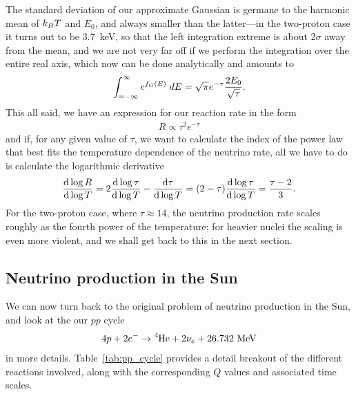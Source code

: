 The standard deviation of our approximate Gaussian is germane to the harmonic mean
of $k_B T$ and $E_0$, and always smaller than the latter---in the two-proton case it
turns out to be $3.7$~keV, so that the left integration extreme is about
$2\sigma$ away from the mean, and we are not very far off if we perform the integration
over the entire real axis, which now can be done analytically and amounts to
\begin{align*}
  \int_{=-\infty}^\infty e^{f_G(E)} \;d{E} = \sqrt{\pi} e^{-\tau} \frac{2E_0}{\sqrt{\tau}}.
\end{align*}
This all said, we have an expression for our reaction rate in the form
\begin{align}
  R \propto \tau^2 e^{-\tau}
\end{align}
and if, for any given value of $\tau$, we want to calculate the index of the power
law that best fits the temperature dependence of the neutrino rate, all we have
to do is calculate the logarithmic derivative
\begin{align}
  \dv{\log R}{\log T} = 2 \dv{\log \tau}{\log T} - \dv{\tau}{\log T} =
  (2 - \tau) \dv{\log \tau}{\log T} = \frac{\tau - 2}{3}.
\end{align}
For the two-proton case, where $\tau \approx 14$, the neutrino production rate scales
roughly as the fourth power of the temperature; for heavier nuclei the scaling is
even more violent, and we shall get back to this in the next section.


\subsection{Neutrino production in the Sun}
\label{sec:nu_production_sun}

We can now turn back to the original problem of neutrino production in the Sun,
and look at the our $pp$ cycle
\begin{align*}
  4p + 2e^- \rightarrow \ce{^4He} + 2\nu_e + 26.732~\text{MeV}
\end{align*}
in more details. Table~\ref{tab:pp_cycle} provides a detail breakout of the
different reactions involved, along with the corresponding $Q$ values and
associated time scales.

